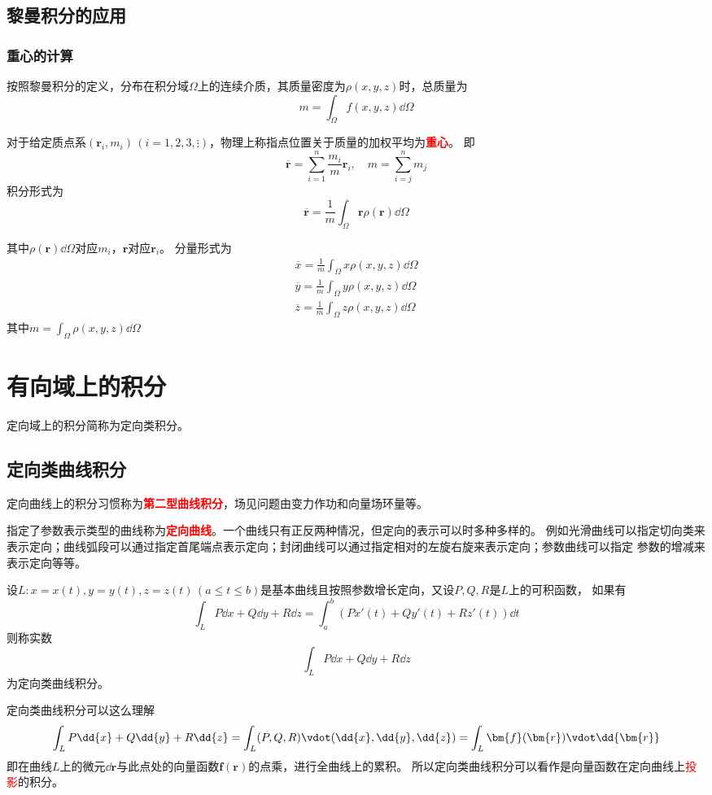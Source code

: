 \subsection{黎曼积分的应用}
\subsubsection{重心的计算}
按照黎曼积分的定义，分布在积分域$\Omega$上的连续介质，其质量密度为$\rho(x,y,z)$时，总质量为
\[ m = \int_\Omega f(x,y,z)\dd{\Omega} \]

对于给定质点系$(\bm{r}_i,m_i)\,(i=1,2,3,\vdots)$，物理上称指点位置关于质量的加权平均为\textcolor{red}{\textbf{\textsf{重心}}}。
即
\[ \overline{\bm{r}} = \sum_{i=1}^{n} \frac{m_i}{m}\bm{r}_i, \quad m = \sum_{i=j}^n m_j \]
积分形式为
\begin{equation}
    \overline{\bm{r}} = \frac{1}{m}\int_\Omega \bm{r} \rho(\bm{r})\dd{\Omega}
\end{equation}

其中$\rho(\bm{r})\dd{\Omega}$对应$m_i$，$\bm{r}$对应$\bm{r}_i$。
分量形式为
\begin{align}
    \overline{x} = \frac{1}{m}\int_\Omega x\rho(x,y,z)\dd{\Omega} \\
    \overline{y} = \frac{1}{m}\int_\Omega y\rho(x,y,z)\dd{\Omega} \\
    \overline{z} = \frac{1}{m}\int_\Omega z\rho(x,y,z)\dd{\Omega}
\end{align}
其中$\displaystyle m = \int_\Omega \rho(x,y,z)\dd{\Omega}$

\section{有向域上的积分}
定向域上的积分简称为定向类积分。
\subsection{定向类曲线积分}
定向曲线上的积分习惯称为\textcolor{red}{\textbf{\textsf{第二型曲线积分}}}，场见问题由变力作功和向量场环量等。

指定了参数表示类型的曲线称为\textcolor{red}{\textbf{\textsf{定向曲线}}}。一个曲线只有正反两种情况，但定向的表示可以时多种多样的。
例如光滑曲线可以指定切向类来表示定向；曲线弧段可以通过指定首尾端点表示定向；封闭曲线可以通过指定相对的左旋右旋来表示定向；参数曲线可以指定
参数的增减来表示定向等等。

\begin{definition}
    设$L:x=x(t),y=y(t),z=z(t)\,(a\leq t\leq b)$是基本曲线且按照参数增长定向，又设$P,Q,R$是$L$上的可积函数，
    如果有
    \[ \int_L P\dd{x} + Q\dd{y} + R\dd{z} = \int_a^b (Px'(t) + Qy'(t) + Rz'(t))\dd{t} \]
    则称实数
    \[ \int_L P\dd{x} + Q\dd{y} + R\dd{z} \]
    为定向类曲线积分。
\end{definition}
定向类曲线积分可以这么理解
\[ \int_L P\dd{x} + Q\dd{y} + R\dd{z} = \int_L (P,Q,R) \vdot (\dd{x},\dd{y},\dd{z}) = \int_L \bm{f}(\bm{r}) \vdot \dd{\bm{r}} \]
即在曲线$L$上的微元$\dd{\bm{r}}$与此点处的向量函数$\bm{f}(\bm{r})$的点乘，进行全曲线上的累积。
所以定向类曲线积分可以看作是向量函数在定向曲线上\textcolor{red}{投影}的积分。

